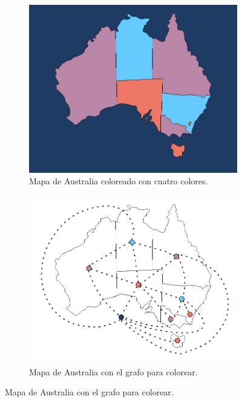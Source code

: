 \begin{figure}[h]
  \centering
  \begin{subfigure}[b]{0.28\linewidth}
    \includegraphics[width=\linewidth]{3/img/4_colors_australia_mapa}
    \caption{Mapa de Australia coloreado con cuatro colores.}
  \end{subfigure}   
    \begin{subfigure}[b]{0.28\linewidth}
    \includegraphics[width=\linewidth]{3/img/4_colors_australia_mapa_y_grafo}
    \caption{Mapa de Australia con el grafo para colorear.}
  \end{subfigure} 

\end{figure}
